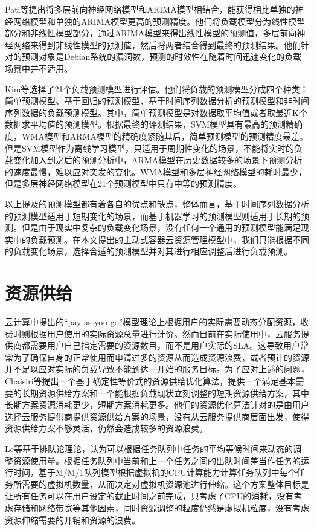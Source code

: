 Pati等提出将多层前向神经网络模型和ARIMA模型相结合，能获得相比单独的神经网络模型和单独的ARIMA模型更高的预测精度\cite{pati2014comparison}。他们将负载模型分为线性模型部分和非线性模型部分，通过ARIMA模型来得出线性模型的预测值，多层前向神经网络来得到非线性模型的预测值，然后将两者结合得到最终的预测结果。他们针对的预测对象是Debian系统的漏洞数，预测的时效性在随着时间迅速变化的负载场景中并不适用。

Kim等选择了21个负载预测模型进行评估\cite{kim2016empirical}。他们将负载的预测模型分成四个种类：简单预测模型、基于回归的预测模型、基于时间序列数据分析的预测模型和非时间序列数据的负载预测模型。其中，简单预测模型是对数据取平均值或者取最近K个数据求平均值的预测模型。根据最终的评测结果，SVM模型具有最高的预测精确度，WMA模型和ARMA模型的精确度紧随其后，简单预测模型的预测精度最差。但是SVM模型作为离线学习模型，只适用于周期性变化的场景，不能将实时的负载变化加入到之后的预测分析中，ARMA模型在历史数据较多的场景下预测分析的速度最慢，难以应对突发的变化。WMA模型和多层神经网络模型的耗时最少，但是多层神经网络模型在21个预测模型中只有中等的预测精度。

以上提及的预测模型都有着各自的优点和缺点，整体而言，基于时间序列数据分析的预测模型适用于短期变化的场景，而基于机器学习的预测模型则适用于长期的预测。但是由于现实中复杂的负载变化场景，没有任何一个通用的预测模型能满足现实中的负载预测。在本文提出的主动式容器云资源管理模型中，我们只能根据不同的负载变化场景，选择合适的预测模型并对其进行相应调整后进行负载预测。

\section{资源供给}
云计算中提出的“pay-as-you-go”模型理论上根据用户的实际需要动态分配资源，收费时则根据用户使用的实际资源总量进行计价\cite{armbrust2010view}。然而目前在实际使用中，云服务提供商都需要用户自己指定需要的资源数目，而不是用户实际的SLA\cite{patel2009service}。这导致用户常常为了确保自身的正常使用而申请过多的资源从而造成资源浪费，或者预计的资源并不足以应对实际的负载导致不能到达一开始的服务目标。为了应对上述的问题，Chaisiri等提出一个基于确定性等价式的资源供给优化算法，提供一个满足基本需要的长期资源供给方案和一个能根据负载现状立刻调整的短期资源供给方案，其中长期方案资源消耗更少，短期方案消耗更多\cite{chaisiri2012optimization}。他们的资源优化算法针对的是由用户选择云服务提供商提供资源供给方案的场景，没有从云服务提供商层面出发，使得资源供给方案不够灵活，仍然会造成较多的资源浪费。

Le等基于排队论理论，认为可以根据任务队列中任务的平均等候时间来动态的调整资源使用量\cite{le2013dynamic}。根据任务队列中当前和上一个任务之间的出队时间差当作任务的运行时间，基于M/M/1队列模型根据虚拟机的CPU计算能力计算任务队列中每个任务所需要的虚拟机数量，从而决定对虚拟机资源池进行伸缩。这个方案整体目标是让所有任务可以在用户设定的截止时间之前完成，只考虑了CPU的消耗，没有考虑存储和网络带宽等其他因素，同时资源调整的粒度仍然是虚拟机粒度，没有考虑资源伸缩需要的开销和资源的浪费。

